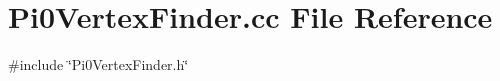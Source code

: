 \section{Pi0\+Vertex\+Finder.\+cc File Reference}
\label{Pi0VertexFinder_8cc}
{\ttfamily \#include \char`\"{}Pi0\+Vertex\+Finder.\+h\char`\"{}}\newline

